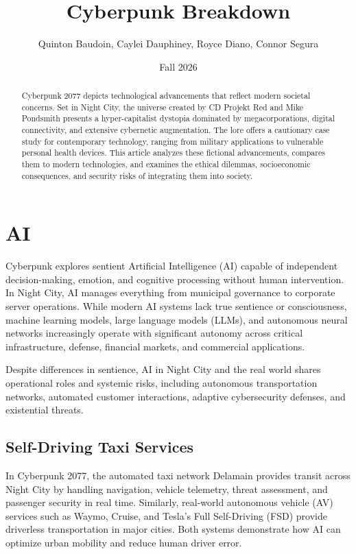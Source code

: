 \documentclass{article}%
\title{Cyberpunk Breakdown}
\author{Quinton Baudoin, Caylei Dauphiney, Royce Diano, Connor Segura}
\date{Fall 2026} %
\begin{document}
\maketitle%

\begin{abstract}
Cyberpunk 2077 depicts technological advancements that reflect modern societal concerns. Set in Night City, the universe created by CD Projekt Red and Mike Pondsmith presents a hyper-capitalist dystopia dominated by megacorporations, digital connectivity, and extensive cybernetic augmentation. The lore offers a cautionary case study for contemporary technology, ranging from military applications to vulnerable personal health devices. This article analyzes these fictional advancements, compares them to modern technologies, and examines the ethical dilemmas, socioeconomic consequences, and security risks of integrating them into society.
\end{abstract}

\section{AI}
Cyberpunk explores sentient Artificial Intelligence (AI) capable of independent decision-making, emotion, and cognitive processing without human intervention. In Night City, AI manages everything from municipal governance to corporate server operations. While modern AI systems lack true sentience or consciousness, machine learning models, large language models (LLMs), and autonomous neural networks increasingly operate with significant autonomy across critical infrastructure, defense, financial markets, and commercial applications.

Despite differences in sentience, AI in Night City and the real world shares operational roles and systemic risks, including autonomous transportation networks, automated customer interactions, adaptive cybersecurity defenses, and existential threats.

\subsection{Self-Driving Taxi Services}
In Cyberpunk 2077, the automated taxi network Delamain provides transit across Night City by handling navigation, vehicle telemetry, threat assessment, and passenger security in real time. Similarly, real-world autonomous vehicle (AV) services such as Waymo, Cruise, and Tesla's Full Self-Driving (FSD) provide driverless transportation in major cities. Both systems demonstrate how AI can optimize urban mobility and reduce human driver error.
\end{document}
